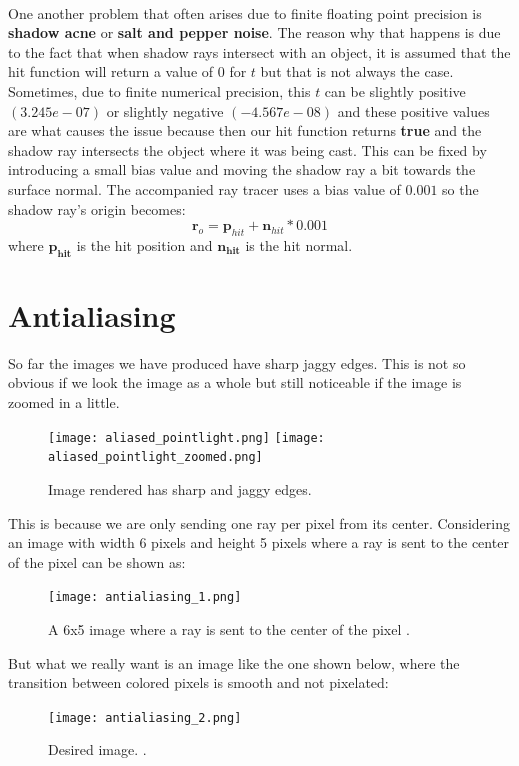 \documentclass[11pt,a4paper]{article}
\begin{document}
	\noindent
	\\
	One another problem that often arises due to finite floating point precision is \textbf{shadow acne} or \textbf{salt and pepper noise}. The reason why that happens is due to the fact that when shadow rays intersect with an object, it is assumed that the hit function will return a value of $0$ for $t$ but that is not always the case. Sometimes, due to finite numerical precision, this $t$ can be slightly positive $(3.245e-07)$ or slightly negative $(-4.567e-08)$ and these positive values are what causes the issue because then our hit function returns \textbf{true} and the shadow ray intersects the object where it was being cast. This can be fixed by introducing a small bias value and moving the shadow ray a bit towards the surface normal. The accompanied ray tracer uses a bias value of $0.001$ so the shadow ray's origin becomes:
	\begin{equation}
		\boldsymbol{r}_{o} = \boldsymbol{p}_{hit} + \boldsymbol{n}_{hit} * 0.001
	\end{equation}
	where $\boldsymbol{p_{hit}}$ is the hit position and $\boldsymbol{n_{hit}}$ is the hit normal.
	
	\section{Antialiasing}
	So far the images we have produced have sharp jaggy edges. This is not so obvious if we look the image as a whole but still noticeable if the image is zoomed in a little.
	\begin{figure}[H]
		\centering
		\captionsetup{justification=centering}
		\texttt{[image: aliased\_pointlight.png]}\quad
		\texttt{[image: aliased\_pointlight\_zoomed.png]}\quad
		\caption{Image rendered has sharp and jaggy edges.}
	\end{figure}
	\noindent
	This is because we are only sending one ray per pixel from its center. Considering an image with width 6 pixels and height 5 pixels where a ray is sent to the center of the pixel can be shown as:
	\begin{figure}[H]
		\centering
		\captionsetup{justification=centering}
		\texttt{[image: antialiasing\_1.png]}\quad
		\caption{A 6x5 image where a ray is sent to the center of the pixel \protect\cite{suffern2016ray}.}
	\end{figure}
	\noindent
	But what we really want is an image like the one shown below, where the transition between colored pixels is smooth and not pixelated:
	\begin{figure}[H]
		\centering
		\captionsetup{justification=centering}
		\texttt{[image: antialiasing\_2.png]}\quad
		\caption{Desired image. \protect\cite{suffern2016ray}.}
	\end{figure}
	
\end{document}
